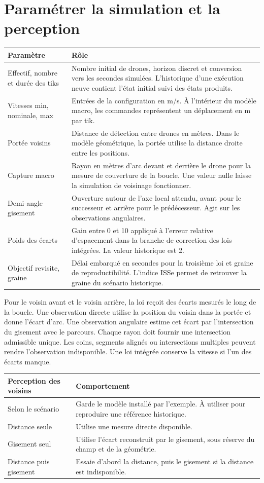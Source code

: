 \documentclass[11pt,a4paper]{article}
\begin{document}
\section{Paramétrer la simulation et la perception}
\begin{tabularx}{\linewidth}{@{}p{.33\linewidth}Y@{}}
\toprule
Paramètre & Rôle \\
\midrule
Effectif, nombre et durée des tiks & Nombre initial de drones, horizon discret et conversion vers les secondes simulées. L'historique d'une exécution neuve contient l'état initial suivi des états produits. \\
Vitesses min, nominale, max & Entrées de la configuration en m/s. À l'intérieur du modèle macro, les commandes représentent un déplacement en m par tik. \\
Portée voisins & Distance de détection entre drones en mètres. Dans le modèle géométrique, la portée utilise la distance droite entre les positions. \\
Capture macro & Rayon en mètres d'arc devant et derrière le drone pour la mesure de couverture de la boucle. Une valeur nulle laisse la simulation de voisinage fonctionner. \\
Demi-angle gisement & Ouverture autour de l'axe local attendu, avant pour le successeur et arrière pour le prédécesseur. Agit sur les observations angulaires. \\
Poids des écarts & Gain entre 0 et 10 appliqué à l'erreur relative d'espacement dans la branche de correction des lois intégrées. La valeur historique est 2. \\
Objectif revisite, graine & Délai embarqué en secondes pour la troisième loi et graine de reproductibilité. L'indice ISSe permet de retrouver la graine du scénario historique. \\
\bottomrule
\end{tabularx}

Pour le voisin avant et le voisin arrière, la loi reçoit des écarts mesurés le long de la boucle. Une observation directe utilise la position du voisin dans la portée et donne l'écart d'arc. Une observation angulaire estime cet écart par l'intersection du gisement avec le parcours. Chaque rayon doit fournir une intersection admissible unique. Les coins, segments alignés ou intersections multiples peuvent rendre l'observation indisponible. Une loi intégrée conserve la vitesse si l'un des écarts manque.

\begin{tabularx}{\linewidth}{@{}lY@{}}
\toprule
Perception des voisins & Comportement \\
\midrule
Selon le scénario & Garde le modèle installé par l'exemple. À utiliser pour reproduire une référence historique. \\
Distance seule & Utilise une mesure directe disponible. \\
Gisement seul & Utilise l'écart reconstruit par le gisement, sous réserve du champ et de la géométrie. \\
Distance puis gisement & Essaie d'abord la distance, puis le gisement si la distance est indisponible. \\
\bottomrule
\end{tabularx}
\end{document}
